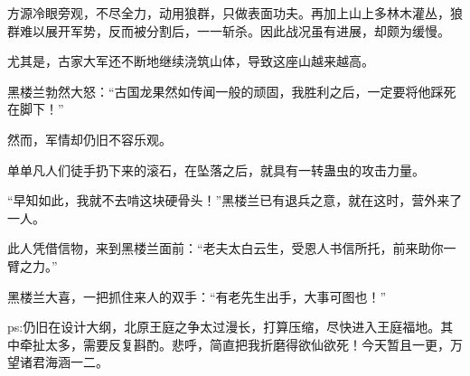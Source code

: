 \begin{this_body}
方源冷眼旁观，不尽全力，动用狼群，只做表面功夫。再加上山上多林木灌丛，狼群难以展开军势，反而被分割后，一一斩杀。因此战况虽有进展，却颇为缓慢。

尤其是，古家大军还不断地继续浇筑山体，导致这座山越来越高。

黑楼兰勃然大怒：“古国龙果然如传闻一般的顽固，我胜利之后，一定要将他踩死在脚下！”

然而，军情却仍旧不容乐观。

单单凡人们徒手扔下来的滚石，在坠落之后，就具有一转蛊虫的攻击力量。

“早知如此，我就不去啃这块硬骨头！”黑楼兰已有退兵之意，就在这时，营外来了一人。

此人凭借信物，来到黑楼兰面前：“老夫太白云生，受恩人书信所托，前来助你一臂之力。”

黑楼兰大喜，一把抓住来人的双手：“有老先生出手，大事可图也！”

ps:仍旧在设计大纲，北原王庭之争太过漫长，打算压缩，尽快进入王庭福地。其中牵扯太多，需要反复斟酌。悲呼，简直把我折磨得欲仙欲死！今天暂且一更，万望诸君海涵一二。

\end{this_body}

